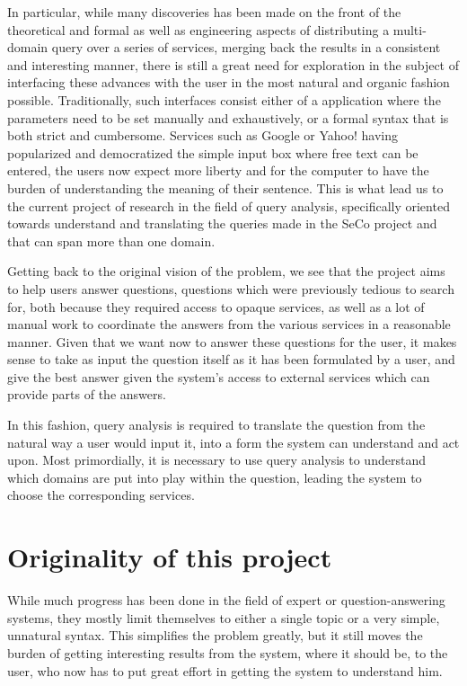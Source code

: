 In particular, while many discoveries has been made on the front of the theoretical and formal as well as engineering aspects of distributing a multi-domain query over a series of services, merging back the results in a consistent and interesting manner, there is still a great need for exploration in the subject of interfacing these advances with the user in the most natural and organic fashion possible. Traditionally, such interfaces consist either of a application where the parameters need to be set manually and exhaustively, or a formal syntax that is both strict and cumbersome. Services such as Google or Yahoo! having popularized and democratized the simple input box where free text can be entered, the users now expect more liberty and for the computer to have the burden of understanding the meaning of their sentence. This is what lead us to the current project of research in the field of query analysis, specifically oriented towards understand and translating the queries made in the SeCo project and that can span more than one domain.

Getting back to the original vision of the problem, we see that the project aims to help users answer questions, questions which were previously tedious to search for, both because they required access to opaque services, as well as a lot of manual work to coordinate the answers from the various services in a reasonable manner. Given that we want now to answer these questions for the user, it makes sense to take as input the question itself as it has been formulated by a user, and give the best answer given the system's access to external services which can provide parts of the answers.

In this fashion, query analysis is required to translate the question from the natural way a user would input it, into a form the system can understand and act upon. Most primordially, it is necessary to use query analysis to understand which domains are put into play within the question, leading the system to choose the corresponding services.

\section{Originality of this project} %
\label{sec:originality}

While much progress has been done in the field of expert or question-answering systems, they mostly limit themselves to either a single topic or a very simple, unnatural syntax. This simplifies the problem greatly, but it still moves the burden of getting interesting results from the system, where it should be, to the user, who now has to put great effort in getting the system to understand him.

